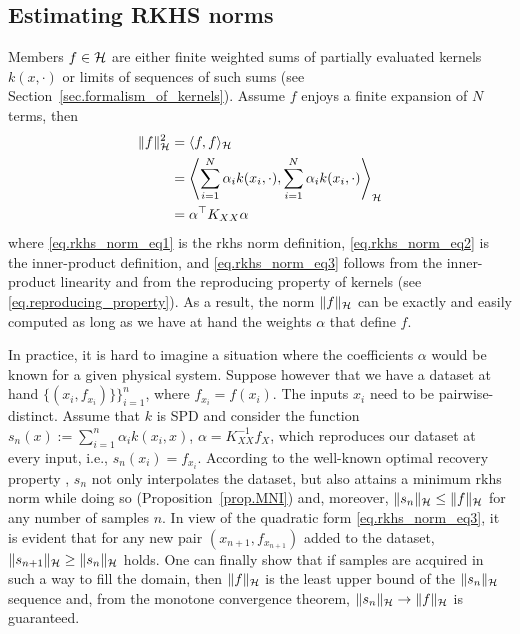 \subsection{Estimating RKHS norms}
\label{sec.appendix_estimating_rkhs_norms}

Members $f \in \mathcal{H}$ are either finite weighted sums of partially evaluated kernels $k(x,\cdot)$ or limits of sequences of such sums (see Section~\ref{sec.formalism_of_kernels}). Assume $f$ enjoys a finite expansion of $N$ terms, then
\begin{align}
	\Vert f \Vert_{\mathcal{H}}^2 &= \langle f, f \rangle_{\mathcal{H}} \label{eq.rkhs_norm_eq1} \\
	&= \left\langle \sum_{i=1}^N \alpha_i k(x_i,\cdot), \sum_{i=1}^N \alpha_i k(x_i,\cdot) \right\rangle_{\mathcal{H}} \label{eq.rkhs_norm_eq2} \\
	&= \alpha^\top K_{XX} \alpha \label{eq.rkhs_norm_eq3}
\end{align}
where \eqref{eq.rkhs_norm_eq1} is the \ac{rkhs} norm definition, \eqref{eq.rkhs_norm_eq2} is the inner-product definition, and \eqref{eq.rkhs_norm_eq3} follows from the inner-product linearity and from the reproducing property of kernels (see \eqref{eq.reproducing_property}). As a result, the norm $\Vert f \Vert_{\mathcal{H}}$ can be exactly and easily computed as long as we have at hand the weights $\alpha$ that define $f$.

In practice, it is hard to imagine a situation where the coefficients $\alpha$ would be known for a given physical system. Suppose however that we have a dataset at hand $\{(x_i,f_{x_i})\}\}_{i=1}^n$, where $f_{x_i} = f(x_i)$. The inputs $x_i$ need to be pairwise-distinct. Assume that $k$ is SPD and consider the function $s_n(x) := \sum_{i=1}^n \alpha_i k(x_i,x)$, $\alpha = K_{XX}^{-1} f_X$, which reproduces our dataset at every input, i.e., $s_n(x_i) = f_{x_i}$. According to the well-known optimal recovery property \cite[§8.3]{iske2018approximation}, $s_n$ not only interpolates the dataset, but also attains a minimum \ac{rkhs} norm while doing so  (Proposition~\ref{prop.MNI}) and, moreover, $\Vert s_n \Vert_{\mathcal{H}} \leq \Vert f \Vert_{\mathcal{H}}$ for any number of samples $n$. In view of the quadratic form \eqref{eq.rkhs_norm_eq3}, it is evident that for any new pair $(x_{n+1},f_{x_{n+1}})$ added to the dataset, $\Vert s_{n+1} \Vert_{\mathcal{H}} \geq \Vert s_n \Vert_{\mathcal{H}}$ holds. One can finally show that if samples are acquired in such a way to fill the domain, then $\Vert f \Vert_{\mathcal{H}}$ is the least upper bound of the $\Vert s_n \Vert_{\mathcal{H}}$ sequence and, from the monotone convergence theorem, $\Vert s_n \Vert_{\mathcal{H}} \rightarrow \Vert f \Vert_{\mathcal{H}}$ is guaranteed.

